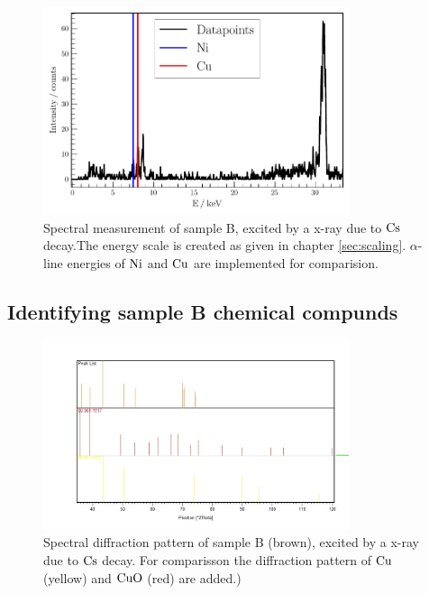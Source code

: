 \begin{figure}
    \centering
    \captionsetup{width=0.9\linewidth}
    \includegraphics[width=0.8\textwidth]{plots/B-spectrum.pdf}
  \caption{Spectral measurement of sample B, excited by a x-ray due to $\ce{Cs}$ decay.The energy scale is created as given in chapter \ref{sec:scaling}. $\alpha$-line energies of $\ce{Ni}$ and $\ce{Cu}$ are implemented for comparision.}
    \label{fig:Samp_B}
\end{figure}

\subsection{Identifying sample B chemical compunds}
\label{sec:sampleB-diff}

\begin{figure}
    \centering
    \captionsetup{width=0.9\linewidth}
    \includegraphics[width=0.8\textwidth]{graphics/SAMPLE_B_1.JPG}
  \caption{Spectral diffraction pattern of sample B (brown), excited by a x-ray due to $\ce{Cs}$ decay. For comparisson the diffraction pattern of $\ce{Cu}$\cite{Cu} (yellow) and $\ce{CuO}$\cite{CuO} (red) are added.)}
    \label{fig:diffraction}
\end{figure}

